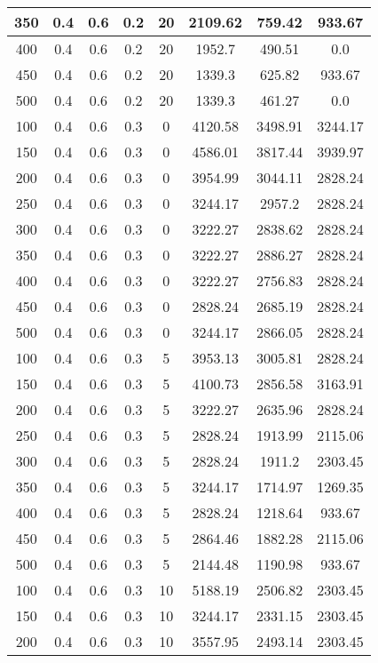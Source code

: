 \documentclass[a4paper, 12pt]{extreport}
\begin{document}
\begin{itemize}
\begin{longtable}{|c|c|c|c|c|c|c|c|}
			350 & 0.4 & 0.6 & 0.2 & 20 & 2109.62 & 759.42 & 933.67 \\\hline
			400 & 0.4 & 0.6 & 0.2 & 20 & 1952.7 & 490.51 & 0.0 \\\hline
			450 & 0.4 & 0.6 & 0.2 & 20 & 1339.3 & 625.82 & 933.67 \\\hline
			500 & 0.4 & 0.6 & 0.2 & 20 & 1339.3 & 461.27 & 0.0 \\\hline
			100 & 0.4 & 0.6 & 0.3 & 0 & 4120.58 & 3498.91 & 3244.17 \\\hline
			150 & 0.4 & 0.6 & 0.3 & 0 & 4586.01 & 3817.44 & 3939.97 \\\hline
			200 & 0.4 & 0.6 & 0.3 & 0 & 3954.99 & 3044.11 & 2828.24 \\\hline
			250 & 0.4 & 0.6 & 0.3 & 0 & 3244.17 & 2957.2 & 2828.24 \\\hline
			300 & 0.4 & 0.6 & 0.3 & 0 & 3222.27 & 2838.62 & 2828.24 \\\hline
			350 & 0.4 & 0.6 & 0.3 & 0 & 3222.27 & 2886.27 & 2828.24 \\\hline
			400 & 0.4 & 0.6 & 0.3 & 0 & 3222.27 & 2756.83 & 2828.24 \\\hline
			450 & 0.4 & 0.6 & 0.3 & 0 & 2828.24 & 2685.19 & 2828.24 \\\hline
			500 & 0.4 & 0.6 & 0.3 & 0 & 3244.17 & 2866.05 & 2828.24 \\\hline
			100 & 0.4 & 0.6 & 0.3 & 5 & 3953.13 & 3005.81 & 2828.24 \\\hline
			150 & 0.4 & 0.6 & 0.3 & 5 & 4100.73 & 2856.58 & 3163.91 \\\hline
			200 & 0.4 & 0.6 & 0.3 & 5 & 3222.27 & 2635.96 & 2828.24 \\\hline
			250 & 0.4 & 0.6 & 0.3 & 5 & 2828.24 & 1913.99 & 2115.06 \\\hline
			300 & 0.4 & 0.6 & 0.3 & 5 & 2828.24 & 1911.2 & 2303.45 \\\hline
			350 & 0.4 & 0.6 & 0.3 & 5 & 3244.17 & 1714.97 & 1269.35 \\\hline
			400 & 0.4 & 0.6 & 0.3 & 5 & 2828.24 & 1218.64 & 933.67 \\\hline
			450 & 0.4 & 0.6 & 0.3 & 5 & 2864.46 & 1882.28 & 2115.06 \\\hline
			500 & 0.4 & 0.6 & 0.3 & 5 & 2144.48 & 1190.98 & 933.67 \\\hline
			100 & 0.4 & 0.6 & 0.3 & 10 & 5188.19 & 2506.82 & 2303.45 \\\hline
			150 & 0.4 & 0.6 & 0.3 & 10 & 3244.17 & 2331.15 & 2303.45 \\\hline
			200 & 0.4 & 0.6 & 0.3 & 10 & 3557.95 & 2493.14 & 2303.45 \\\hline

\end{longtable}
\end{itemize}
\end{document}
